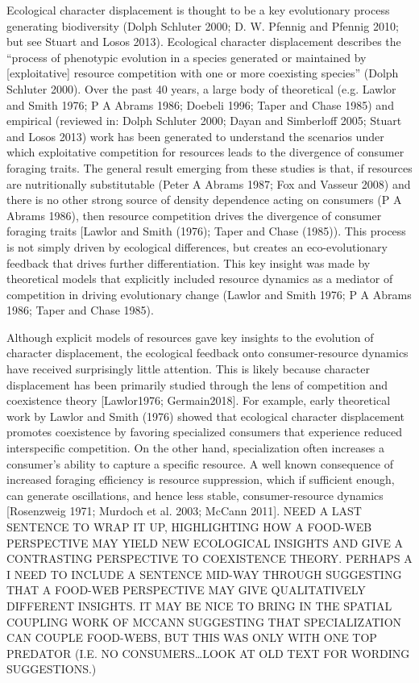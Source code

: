 \documentclass[11pt,]{article}
\begin{document}
Ecological character displacement is thought to be a key evolutionary
process generating biodiversity (Dolph Schluter 2000; D. W. Pfennig and
Pfennig 2010; but see Stuart and Losos 2013). Ecological character
displacement describes the ``process of phenotypic evolution in a
species generated or maintained by {[}exploitative{]} resource
competition with one or more coexisting species'' (Dolph Schluter 2000).
Over the past 40 years, a large body of theoretical (e.g. Lawlor and
Smith 1976; P A Abrams 1986; Doebeli 1996; Taper and Chase 1985) and
empirical (reviewed in: Dolph Schluter 2000; Dayan and Simberloff 2005;
Stuart and Losos 2013) work has been generated to understand the
scenarios under which exploitative competition for resources leads to
the divergence of consumer foraging traits. The general result emerging
from these studies is that, if resources are nutritionally substitutable
(Peter A Abrams 1987; Fox and Vasseur 2008) and there is no other strong
source of density dependence acting on consumers (P A Abrams 1986), then
resource competition drives the divergence of consumer foraging traits
{[}Lawlor and Smith (1976); Taper and Chase (1985)). This process is not
simply driven by ecological differences, but creates an eco-evolutionary
feedback that drives further differentiation. This key insight was made
by theoretical models that explicitly included resource dynamics as a
mediator of competition in driving evolutionary change (Lawlor and Smith
1976; P A Abrams 1986; Taper and Chase 1985).

Although explicit models of resources gave key insights to the evolution
of character displacement, the ecological feedback onto
consumer-resource dynamics have received surprisingly little attention.
This is likely because character displacement has been primarily studied
through the lens of competition and coexistence theory {[}Lawlor1976;
Germain2018{]}. For example, early theoretical work by Lawlor and Smith
(1976) showed that ecological character displacement promotes
coexistence by favoring specialized consumers that experience reduced
interspecific competition. On the other hand, specialization often
increases a consumer's ability to capture a specific resource. A well
known consequence of increased foraging efficiency is resource
suppression, which if sufficient enough, can generate oscillations, and
hence less stable, consumer-resource dynamics {[}Rosenzweig 1971;
Murdoch et al. 2003; McCann 2011{]}. NEED A LAST SENTENCE TO WRAP IT UP,
HIGHLIGHTING HOW A FOOD-WEB PERSPECTIVE MAY YIELD NEW ECOLOGICAL
INSIGHTS AND GIVE A CONTRASTING PERSPECTIVE TO COEXISTENCE THEORY.
PERHAPS A I NEED TO INCLUDE A SENTENCE MID-WAY THROUGH SUGGESTING THAT A
FOOD-WEB PERSPECTIVE MAY GIVE QUALITATIVELY DIFFERENT INSIGHTS. IT MAY
BE NICE TO BRING IN THE SPATIAL COUPLING WORK OF MCCANN SUGGESTING THAT
SPECIALIZATION CAN COUPLE FOOD-WEBS, BUT THIS WAS ONLY WITH ONE TOP
PREDATOR (I.E. NO CONSUMERS\ldots{}LOOK AT OLD TEXT FOR WORDING
SUGGESTIONS.)
\end{document}
